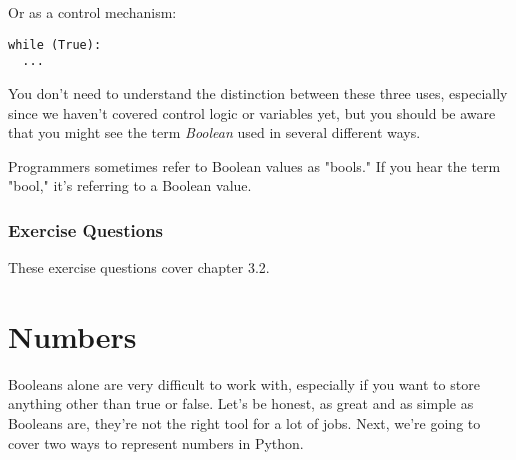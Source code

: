 Or as a control mechanism:

\begin{lstlisting}[style=pippython]
while (True):
  ...
\end{lstlisting}

You don't need to understand the distinction between these three uses, especially since we haven't covered control logic or variables yet, but you should be aware that you might see the term \textit{Boolean} used in several different ways.\par
Programmers sometimes refer to Boolean values as "bools." If you hear the term "bool," it's referring to a Boolean value.
\subsubsection*{Exercise Questions}
These exercise questions cover chapter 3.2. 
\begin{Exercise}
\end{Exercise}
\begin{Exercise}
\end{Exercise}

\section{Numbers}
Booleans alone are very difficult to work with, especially if you want to store anything other than true or false. Let's be honest, as great and as simple as Booleans are, they're not the right tool for a lot of jobs. Next, we're going to cover two ways to represent numbers in Python.
